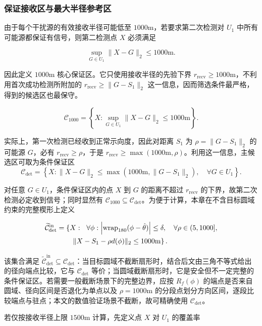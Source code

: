 \subsubsection{保证接收区与最大半径参考区}

由于每个干扰源的有效接收半径可能低至 $1000\mathrm{m}$，若要求第二次检测对 $U_1$ 中所有可能源都保证有信号，则第二检测点 $X$ 必须满足

\[
\sup_{G\in U_1}\lVert X-G\rVert_2\le1000\mathrm{m}.
\]

因此定义 $1000\mathrm{m}$ 核心保证区。它只使用接收半径的先验下界 $r_{\mathrm{recv}}\ge1000\mathrm{m}$，不利用首次成功检测所附加的 $r_{\mathrm{recv}}\ge\lVert G-S_1\rVert_2$ 这一信息，因而筛选条件最严格，得到的候选区也最保守。

\[
\mathcal C_{1000}
=
\left\{
X:
\sup_{G\in U_1}\lVert X-G\rVert_2\le1000\mathrm{m}
\right\}.
\]

实际上，第一次检测已经收到正常示向度，因此对距离 $S_1$ 为 $\rho=\lVert G-S_1\rVert_2$ 的可能源 $G$，必有 $r_{\mathrm{recv}}\ge\rho$，于是 $r_{\mathrm{recv}}\ge\max(1000\mathrm{m},\rho)$。利用这一信息，主候选区可取为条件保证区
\[
\mathcal C_{\det}
=
\left\{
X:
\lVert X-G\rVert_2\le\max(1000\mathrm{m},\lVert G-S_1\rVert_2),
\quad \forall G\in U_1
\right\}.
\]

对任意 $G\in U_1$，条件保证区内的点 $X$ 到 $G$ 的距离不超过 $r_{\mathrm{recv}}$ 的下界，故第二次检测必定收到信号；同时显然有 $\mathcal C_{1000}\subseteq\mathcal C_{\det}$。为便于计算，本章在不含目标圆域约束的完整楔形上定义

\[
\begin{aligned}
\widetilde{\mathcal C}_{\det}^{\mathrm{in}}
&=\left\{X:\vphantom{\left|\operatorname{wrap}_{180}\right|}\right.\ 
\forall\phi:\left|\operatorname{wrap}_{180}(\phi-\hat\theta)\right|\le\delta,\quad
\forall\rho\in(5,1000],\\
&\qquad\left.
\lVert X-S_1-\rho d(\phi)\rVert_2
\le1000\mathrm{m}\right\}.
\end{aligned}
\]

该集合满足 $\widetilde{\mathcal C}_{\det}^{\mathrm{in}}\subseteq\mathcal C_{\det}$：当目标圆域不截断扇形时，结合后文由三角不等式给出的径向端点比较，它与 $\mathcal C_{\det}$ 等价；当圆域截断扇形时，它是安全但不一定完整的条件保证区。若需要一般截断场景下的完整边界，应按 $R_f(\phi)$ 的端点是否来自圆域、径向区间是否退化为单点以及 $\rho=1000\mathrm{m}$ 的分段点划分方向区间，逐段比较端点与驻点；本文的数值验证场景不截断，故可精确使用 $\mathcal C_{\det}$。

若仅按接收半径上限 $1500\mathrm{m}$ 计算，先定义点 $X$ 对 $U_1$ 的覆盖率

